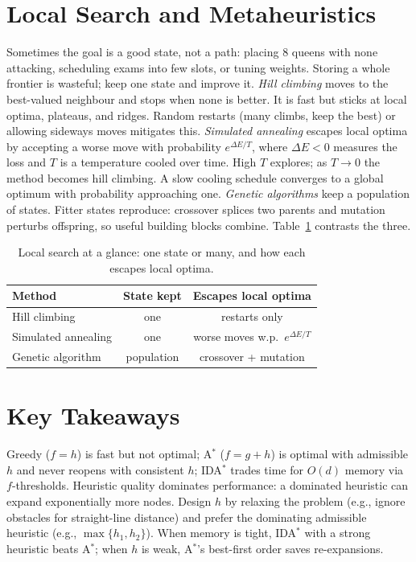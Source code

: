 \section{Local Search and Metaheuristics}
Sometimes the goal is a good state, not a path: placing 8 queens with none attacking,
scheduling exams into few slots, or tuning weights. Storing a whole frontier is wasteful;
keep one state and improve it. \emph{Hill climbing} moves to the best-valued neighbour
and stops when none is better. It is fast but sticks at local optima, plateaus, and ridges.
Random restarts (many climbs, keep the best) or allowing sideways moves mitigates this.
\emph{Simulated annealing} escapes local optima by accepting a worse move with probability
$e^{\Delta E/T}$, where $\Delta E < 0$ measures the loss and $T$ is a temperature cooled
over time. High $T$ explores; as $T \to 0$ the method becomes hill climbing. A slow cooling
schedule converges to a global optimum with probability approaching one.
\emph{Genetic algorithms} keep a population of states. Fitter states reproduce: crossover
splices two parents and mutation perturbs offspring, so useful building blocks combine.
Table~\ref{tab:local-search} contrasts the three.
\begin{table}[h]\centering\small
\begin{tabular}{lcc}
\toprule Method & State kept & Escapes local optima \\\midrule
Hill climbing & one & restarts only \\
Simulated annealing & one & worse moves w.p.\ $e^{\Delta E/T}$ \\
Genetic algorithm & population & crossover + mutation \\\bottomrule
\end{tabular}
\caption{Local search at a glance: one state or many, and how each escapes local optima.}
\label{tab:local-search}
\end{table}
\section{Key Takeaways}
Greedy ($f=h$) is fast but not optimal; A$^{*}$ ($f=g+h$) is optimal with admissible $h$ and never reopens with consistent $h$; IDA$^{*}$ trades time for $O(d)$ memory via $f$-thresholds. Heuristic quality dominates performance: a dominated heuristic can expand exponentially more nodes. Design $h$ by relaxing the problem (e.g., ignore obstacles for straight-line distance) and prefer the dominating admissible heuristic (e.g., $\max\{h_1,h_2\}$). When memory is tight, IDA$^{*}$ with a strong heuristic beats A$^{*}$; when $h$ is weak, A$^{*}$'s best-first order saves re-expansions.

